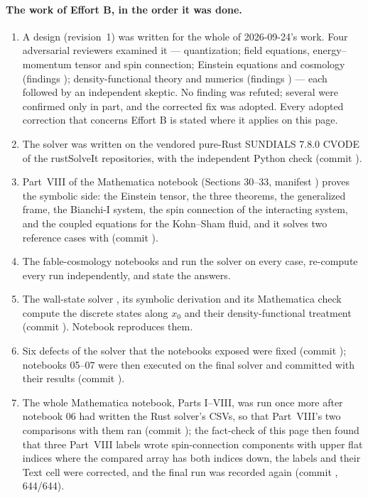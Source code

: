 \paragraph{The work of Effort B, in the order it was done.}
\begin{enumerate}
  \item A design (revision~1) was written for the whole of 2026-09-24's work. Four adversarial
        reviewers examined it --- quantization; field equations, energy--momentum tensor and spin
        connection; Einstein equations and cosmology (findings ); density-functional
        theory and numerics (findings ) --- each followed by an independent skeptic. No
        finding was refuted; several were confirmed only in part, and the corrected fix was adopted.
        Every adopted correction that concerns Effort B is stated where it applies on this page.
  \item The solver  was written on the vendored pure-Rust
        SUNDIALS 7.8.0 CVODE of the rustSolveIt repositories, with the independent Python check
         (commit ).
  \item Part~VIII of the Mathematica notebook (Sections 30--33, manifest
        ) proves the symbolic side: the Einstein tensor, the three
        theorems, the generalized frame, the Bianchi-I system, the spin connection of the interacting
        system, and the coupled equations for the Kohn--Sham fluid, and it solves two reference cases
        with  (commit ).
  \item The fable-cosmology notebooks  and
         run the solver on every case, re-compute every run
        independently, and state the answers.
  \item The wall-state solver , its symbolic derivation and
        its Mathematica check compute the discrete states along $x_0$ and their density-functional
        treatment (commit ). Notebook  reproduces them.
  \item Six defects of the solver that the notebooks exposed were fixed (commit );
        notebooks 05--07 were then executed on the final solver and committed with their results
        (commit ).
  \item The whole Mathematica notebook, Parts I--VIII, was run once more after notebook 06 had written
        the Rust solver's CSVs, so that Part~VIII's two comparisons with them ran (commit
        ); the fact-check of this page then found that three Part~VIII labels wrote
        spin-connection components with upper flat indices where the compared array has both indices
        down, the labels and their Text cell were corrected, and the final run was recorded again
        (commit , 644/644).
\end{enumerate}

